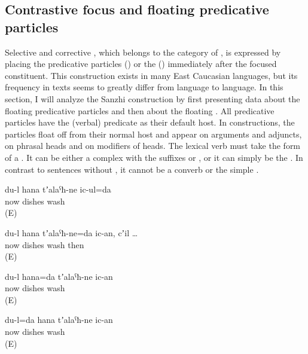 
\subsection{Contrastive focus and floating predicative particles}
\label{ssec:Contrastive focus and floating predicative particles}

Selective and corrective , which belongs to the category of , is expressed by placing the predicative particles () or the  () immediately after the focused constituent. This construction exists in many East Caucasian languages, but its frequency in texts seems to greatly differ from language to language. In this section, I will analyze the Sanzhi construction by first presenting data about the floating predicative particles and then about the floating . All predicative particles have the (verbal) predicate as their default host. In  constructions, the particles float off from their normal host and appear on arguments and adjuncts, on phrasal heads and on modifiers of heads. The lexical verb must take the form of a  . It can be either a complex  with the suffixes  or , or it can simply be the . In contrast to sentences without , it cannot be a converb or the simple .
%
\begin{exe}
	\ex	\label{ex:Now I am cleaning the dishes@3}
	\gll	du-l 	hana 	tʼalaˁħ-ne 	ic-ul=da\\
			now	dishes	wash\\
	\glt	{} (E)

	\ex	\label{ex:Now I am cleaning the dishes@4}
	\gll	du-l 	hana	tʼalaˁħ-ne=da	ic-an,	cʼil	\ldots\\
			now	dishes	wash	then\\
	\glt	{} (E)

	\ex	\label{ex:NOW I am washing the dishes@5}
	\gll	du-l	hana=da	tʼalaˁħ-ne	ic-an\\
			now	dishes	wash\\
	\glt	{} (E)

	\ex	\label{ex:It is ME who is washing the dishes now@6}
	\gll	du-l=da	hana	tʼalaˁħ-ne	ic-an\\
			now	dishes	wash\\
	\glt	{} (E)
\end{exe}


